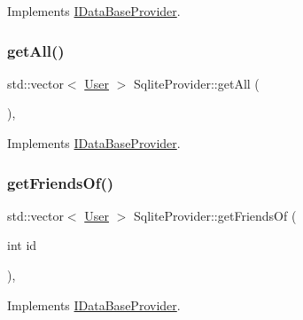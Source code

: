 Implements \mbox{\hyperlink{classIDataBaseProvider_ae959ea126a1fc1df9ffe058d5a3d9851}{I\+Data\+Base\+Provider}}.

\mbox{\label{classSqliteProvider_a0b9c9b002caa7e43ed4590a6a1023525}} 
\subsubsection{\texorpdfstring{get\+All()}{getAll()}}
{\footnotesize\ttfamily std\+::vector$<$ \mbox{\hyperlink{structUser}{User}} $>$ Sqlite\+Provider\+::get\+All (\begin{DoxyParamCaption}{ }\end{DoxyParamCaption})\hspace{0.3cm}{\ttfamily [override]}, {\ttfamily [virtual]}}



Implements \mbox{\hyperlink{classIDataBaseProvider_a15a6d47baac2391f17d911f73e68bd0f}{I\+Data\+Base\+Provider}}.

\mbox{\label{classSqliteProvider_a639fb7f9341b668d17917711fc5ae39a}} 
\subsubsection{\texorpdfstring{get\+Friends\+Of()}{getFriendsOf()}\hspace{0.1cm}{\footnotesize\ttfamily [1/2]}}
{\footnotesize\ttfamily std\+::vector$<$ \mbox{\hyperlink{structUser}{User}} $>$ Sqlite\+Provider\+::get\+Friends\+Of (\begin{DoxyParamCaption}\item[{int}]{id }\end{DoxyParamCaption})\hspace{0.3cm}{\ttfamily [override]}, {\ttfamily [virtual]}}



Implements \mbox{\hyperlink{classIDataBaseProvider_a4d9f2f45058852ecc5cec9c949825529}{I\+Data\+Base\+Provider}}.

